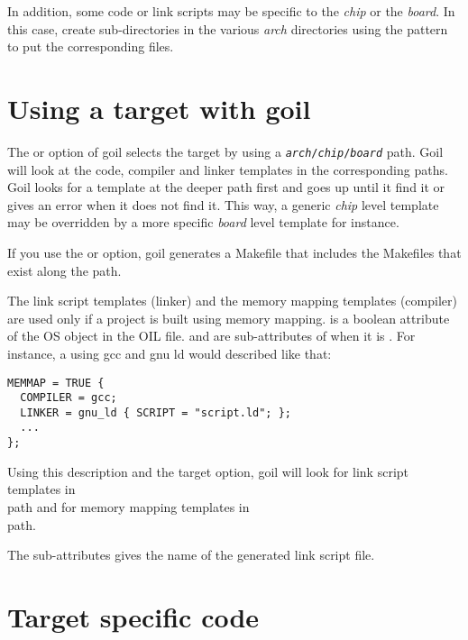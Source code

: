 In addition, some code or link scripts may be specific to the {\em chip} or the {\em board}. In this case, create sub-directories in the various {\em arch} directories using the pattern  to put the corresponding files.

\section{Using a target with goil}

The  or  option of goil selects the target by using a {\tt {\em arch}/{\em chip}/{\em board}} path. Goil will look at the code, compiler and linker templates in the corresponding paths. Goil looks for a template at the deeper path first and goes up until it find it or gives an error when it does not find it. This way, a generic {\em chip} level template may be overridden by a more specific {\em board} level template for instance.

If you use the  or  option, goil generates a Makefile that includes the Makefiles that exist along the path.

The link script templates (linker) and the memory mapping templates (compiler) are used only if a project is built using memory mapping.  is a boolean attribute of the OS object in the OIL file.  and  are sub-attributes of  when it is . For instance, a  using gcc and gnu ld would described like that:

\begin{lstlisting}[language=OIL]
MEMMAP = TRUE {
  COMPILER = gcc;
  LINKER = gnu_ld { SCRIPT = "script.ld"; };
  ...
};
\end{lstlisting}

Using this description and the target option, goil will look for link script templates in\\  path and for memory mapping templates in\\  path.

The  sub-attributes gives the name of the generated link script file.

\section{Target specific code}

